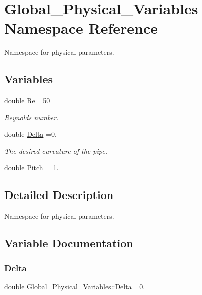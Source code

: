 \hypertarget{namespaceGlobal__Physical__Variables}{}\section{Global\+\_\+\+Physical\+\_\+\+Variables Namespace Reference}
\label{namespaceGlobal__Physical__Variables}


Namespace for physical parameters.  


\subsection*{Variables}
\begin{DoxyCompactItemize}
\item 
double \hyperlink{namespaceGlobal__Physical__Variables_ab814e627d2eb5bc50318879d19ab16b9}{Re} =50
\begin{DoxyCompactList}\small\item\em Reynolds number. \end{DoxyCompactList}\item 
double \hyperlink{namespaceGlobal__Physical__Variables_add290b9e4a9c0e4c18a13faa7e29d857}{Delta} =0.
\begin{DoxyCompactList}\small\item\em The desired curvature of the pipe. \end{DoxyCompactList}\item 
double \hyperlink{namespaceGlobal__Physical__Variables_aa07c6f0e49eeb97e8b49a3b371274c3e}{Pitch} = 1.
\end{DoxyCompactItemize}


\subsection{Detailed Description}
Namespace for physical parameters. 

\subsection{Variable Documentation}
\mbox{\label{namespaceGlobal__Physical__Variables_add290b9e4a9c0e4c18a13faa7e29d857}} 
\subsubsection{\texorpdfstring{Delta}{Delta}}
{\footnotesize\ttfamily double Global\+\_\+\+Physical\+\_\+\+Variables\+::\+Delta =0.}



